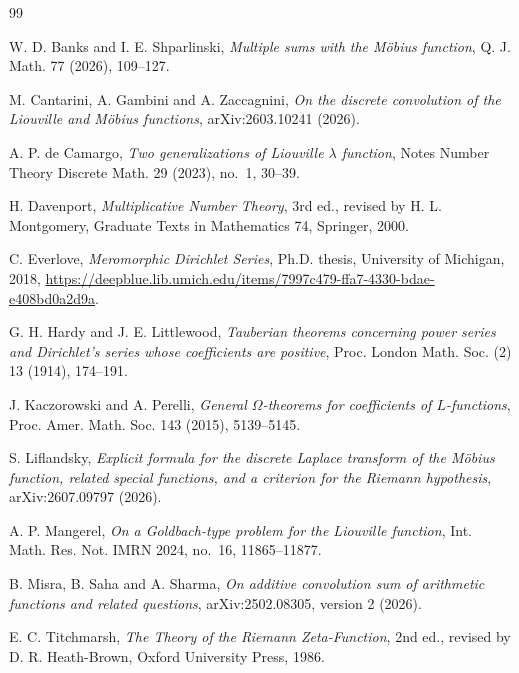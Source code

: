\documentclass[11pt]{article}
\theoremstyle{remark}
\begin{document}
\begin{thebibliography}{99}
\raggedright

W. D. Banks and I. E. Shparlinski,
\emph{Multiple sums with the M\"obius function},
Q. J. Math. 77 (2026), 109--127.

M. Cantarini, A. Gambini and A. Zaccagnini,
\emph{On the discrete convolution of the Liouville and M\"obius functions},
arXiv:2603.10241 (2026).

A. P. de Camargo,
\emph{Two generalizations of Liouville $\lambda$ function},
Notes Number Theory Discrete Math. 29 (2023), no.~1, 30--39.

H. Davenport,
\emph{Multiplicative Number Theory}, 3rd ed., revised by H. L. Montgomery,
Graduate Texts in Mathematics 74, Springer, 2000.

C. Everlove,
\emph{Meromorphic Dirichlet Series}, Ph.D. thesis, University of Michigan, 2018,
\url{https://deepblue.lib.umich.edu/items/7997c479-ffa7-4330-bdae-e408bd0a2d9a}.

G. H. Hardy and J. E. Littlewood,
\emph{Tauberian theorems concerning power series and Dirichlet's series whose coefficients are
positive}, Proc. London Math. Soc. (2) 13 (1914), 174--191.

J. Kaczorowski and A. Perelli,
\emph{General $\Omega$-theorems for coefficients of $L$-functions},
Proc. Amer. Math. Soc. 143 (2015), 5139--5145.

S. Liflandsky,
\emph{Explicit formula for the discrete Laplace transform of the M\"obius function, related
special functions, and a criterion for the Riemann hypothesis},
arXiv:2607.09797 (2026).

A. P. Mangerel,
\emph{On a Goldbach-type problem for the Liouville function},
Int. Math. Res. Not. IMRN 2024, no.~16, 11865--11877.

B. Misra, B. Saha and A. Sharma,
\emph{On additive convolution sum of arithmetic functions and related questions},
arXiv:2502.08305, version 2 (2026).

E. C. Titchmarsh,
\emph{The Theory of the Riemann Zeta-Function}, 2nd ed., revised by D. R. Heath-Brown,
Oxford University Press, 1986.

\end{thebibliography}
\end{document}
